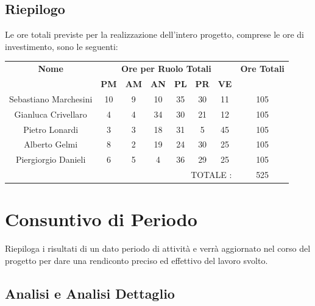 \documentclass[12pt,a4paper,titlepage]{article}
\begin{document}
	\newpage
	
	\subsection{Riepilogo}
	Le ore totali previste per la realizzazione dell'intero progetto, comprese le ore di investimento, sono le seguenti: \\
	
	{\renewcommand\arraystretch{1.2}  %
		\begin{tabular}{|c|c|c|c|c|c|c|c|}
			\hline 
			\textbf{Nome} & \multicolumn{6}{c|}{\textbf{Ore per Ruolo Totali}} & \textbf{Ore Totali} \\ 
			& \textbf{PM} & \textbf{AM} & \textbf{AN} & \textbf{PL} & \textbf{PR} & \textbf{VE} & \\ 
			\hline
			Sebastiano Marchesini	& 10 & 9 & 10 & 35 & 30 & 11 & 105 \\ 
			\hline 
			Gianluca Crivellaro 	& 4 & 4 & 34 & 30 & 21 & 12 & 105 \\ 
			\hline 
			Pietro Lonardi 			& 3 & 3 & 18 & 31 & 5 & 45 & 105 \\ 
			\hline 
			Alberto Gelmi 			& 8 & 2 & 19 & 24 & 30 & 25 & 105 \\ 
			\hline 
			Piergiorgio Danieli 	& 6 & 5 & 4 & 36 & 29 & 25 & 105 \\ 
			\hline 
			\multicolumn{7}{r|}{TOTALE  :} & 525 \\ 
	\end{tabular}} 
	
	
	\newpage
	
	\section{Consuntivo di Periodo}
	Riepiloga i risultati di un dato periodo di attività e verrà aggiornato nel corso del progetto per dare una rendiconto preciso ed effettivo del lavoro svolto. \\
	\subsection{Analisi e Analisi Dettaglio}
	
\end{document}
